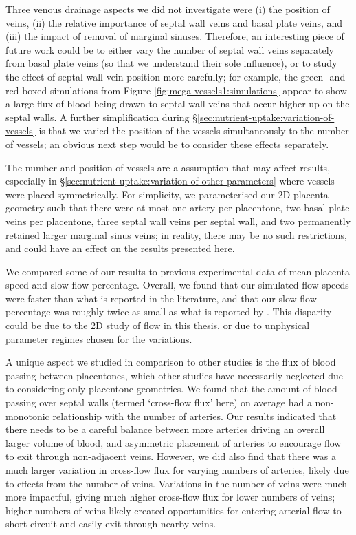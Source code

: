         Three venous drainage aspects we did not investigate were (i) the position of veins, (ii) the relative importance of septal wall veins and basal plate veins, and (iii) the impact of removal of marginal sinuses. Therefore, an interesting piece of future work could be to either vary the number of septal wall veins separately from basal plate veins (so that we understand their sole influence), or to study the effect of septal wall vein position more carefully; for example, the green- and red-boxed simulations from Figure \ref{fig:mega-vessels1:simulations} appear to show a large flux of blood being drawn to septal wall veins that occur higher up on the septal walls. A further simplification during \S\ref{sec:nutrient-uptake:variation-of-vessels} is that we varied the position of the vessels simultaneously to the number of vessels; an obvious next step would be to consider these effects separately.

        The number and position of vessels are a assumption that may affect results, especially in \S\ref{sec:nutrient-uptake:variation-of-other-parameters} where vessels were placed symmetrically. For simplicity, we parameterised our 2D placenta geometry such that there were at most one artery per placentone, two basal plate veins per placentone, three septal wall veins per septal wall, and two permanently retained larger marginal sinus veins; in reality, there may be no such restrictions, and could have an effect on the results presented here.

        We compared some of our results to previous experimental data of mean placenta speed and slow flow percentage. Overall, we found that our simulated flow speeds were faster than what is reported in the literature, and that our slow flow percentage was roughly twice as small as what is reported by \citeauthor{dellschaftHaemodynamicsHumanPlacenta2020} \cite{dellschaftHaemodynamicsHumanPlacenta2020}. This disparity could be due to the 2D study of flow in this thesis, or due to unphysical parameter regimes chosen for the variations.

        A unique aspect we studied in comparison to other studies is the flux of blood passing between placentones, which other studies have necessarily neglected due to considering only placentone geometries. We found that the amount of blood passing over septal walls (termed `cross-flow flux' here) on average had a non-monotonic relationship with the number of arteries. Our results indicated that there needs to be a careful balance between more arteries driving an overall larger volume of blood, and asymmetric placement of arteries to encourage flow to exit through non-adjacent veins. However, we did also find that there was a much larger variation in cross-flow flux for varying numbers of arteries, likely due to effects from the number of veins. Variations in the number of veins were much more impactful, giving much higher cross-flow flux for lower numbers of veins; higher numbers of veins likely created opportunities for entering arterial flow to short-circuit and easily exit through nearby veins.        

